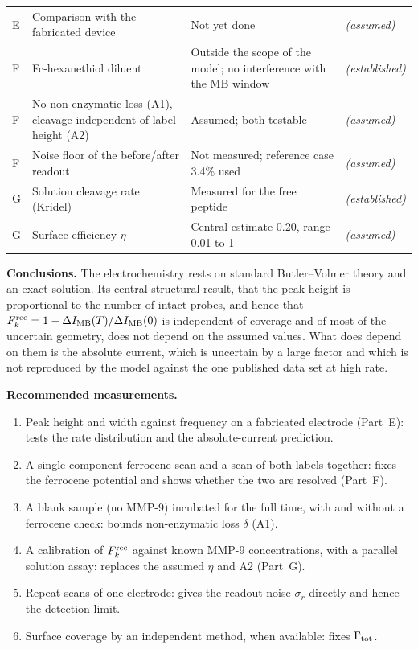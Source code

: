 \documentclass[10pt,a4paper]{article}
\numberwithin{equation}{section}
\newcommand{\DI}{\Delta I}
\newcommand{\Fkrec}{F_k^{\rm rec}}
\newcommand{\Grtot}{\Gamma_{\rm tot}}
\newcommand{\FLAG}{\textit{(assumed)}}
\newcommand{\CONF}{\textit{(established)}}
\begin{document}
\begin{center}
\begin{tabular}{@{}p{0.9cm}p{4.6cm}p{8.3cm}l@{}}
E & Comparison with the fabricated device & Not yet done & \FLAG \\
F & Fc-hexanethiol diluent & Outside the scope of the model; no interference with the MB window & \CONF \\
F & No non-enzymatic loss (A1), cleavage independent of label height (A2) & Assumed; both testable & \FLAG \\
F & Noise floor of the before/after readout & Not measured; reference case 3.4\% used & \FLAG \\
G & Solution cleavage rate (Kridel) & Measured for the free peptide & \CONF \\
G & Surface efficiency $\eta$ & Central estimate 0.20, range 0.01 to 1 & \FLAG \\
\bottomrule
\end{tabular}
\end{center}

\textbf{Conclusions.} The electrochemistry rests on standard Butler--Volmer theory and an exact solution. Its central structural result, that the peak height is proportional to the number of intact probes, and hence
that $\Fkrec=1-\DI_{\rm MB}(T)/\DI_{\rm MB}(0)$ is independent of coverage and of most of the uncertain geometry, does not
depend on the assumed values. What does depend on them is the absolute current, which is uncertain by a large factor and
which is not reproduced by the model against the one published data set at high rate.

\textbf{Recommended measurements.}
\begin{enumerate}[leftmargin=*,noitemsep]
\item Peak height and width against frequency on a fabricated electrode (Part~E): tests the rate distribution and the absolute-current prediction.
\item A single-component ferrocene scan and a scan of both labels together: fixes the ferrocene potential and shows whether the two are resolved (Part~F).
\item A blank sample (no MMP-9) incubated for the full time, with and without a ferrocene check: bounds non-enzymatic loss $\delta$ (A1).
\item A calibration of $\Fkrec$ against known MMP-9 concentrations, with a parallel solution assay: replaces the assumed $\eta$ and A2 (Part~G).
\item Repeat scans of one electrode: gives the readout noise $\sigma_r$ directly and hence the detection limit.
\item Surface coverage by an independent method, when available: fixes $\Grtot$.
\end{enumerate}
\end{document}
